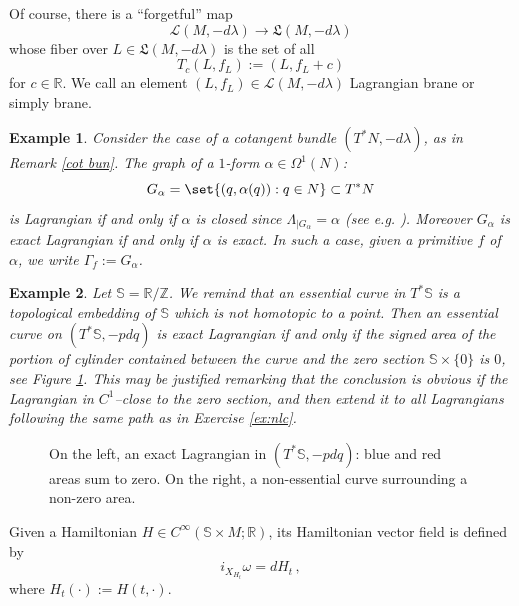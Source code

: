 \documentclass{article}
\newcommand{\1}{\mathbbm{1}}
\newtheorem{es}{Example}
\theoremstyle{remark}
\begin{document}
Of course,  there is a ``forgetful'' map
$$\mathscr{L}(M, -d\lambda) \rightarrow \mathfrak{L}(M, -d\lambda)$$
whose fiber over $L \in \mathfrak{L}(M, -d\lambda)$ is the set of all
$$T_c(L,f_L) := (L,f_L + c)$$
for $c \in \mathbb{R}$. We call an element $(L,f_L) \in \mathscr{L}(M, -d\lambda)$ Lagrangian brane or simply brane. 
\begin{es} \textnormal{Consider the case of a cotangent bundle $(T^*N,-d\lambda)$, as in Remark \ref{cot bun}. The graph of a $1$-form $\alpha \in \Omega^1(N)$:
$$G_\alpha = \set{ (q,\alpha(q)): q \in N} \subset T^*N$$
is Lagrangian if and only if $\alpha$ is closed since $\Lambda_{\mid G_{\alpha}}=\alpha$ (see e.g. \cite[Proposition 3.4.2]{mcDSal16}). Moreover $G_\alpha$ is exact Lagrangian if and only if $\alpha$ is exact. In such a case, given a primitive $f$ of $\alpha$, we write $\Gamma_f := G_\alpha$.}
\end{es}
\begin{es} \textnormal{Let $\mathbb{S}=\mathbb{R}/\mathbb{Z}$. We remind that an essential curve in $T^*\mathbb{S}$ is a topological embedding of $\mathbb{S}$ which is not homotopic to a point. Then an essential curve on $(T^*\mathbb{S}, -pdq)$ is exact Lagrangian if and only if the signed area of the portion of cylinder contained between the curve and the zero section $\mathbb{S} \times \{0\}$ is $0$, see Figure \ref{Lag Cil}. This may be justified remarking that the conclusion is obvious if the Lagrangian in $C^1$--close to the zero section, and then extend it to all Lagrangians following the same path as in Exercise \ref{ex:nlc}.} \newline
\end{es}
\begin{figure}[H]
\centering
 \resizebox{0.7\linewidth}{!}{
}
\caption{On the left, an exact Lagrangian in $(T^*\mathbb{S}, -pdq)$: blue and red areas sum to zero. On the right, a non-essential curve surrounding a non-zero area.}
\label{Lag Cil}
\end{figure}
\noindent Given a Hamiltonian $H \in C^\infty(\mathbb{S} \times M; \mathbb{R})$, its Hamiltonian vector field is defined by 
 $$i_{X_{H_t}} \omega = dH_t\, ,$$
where $H_t(\cdot) := H(t,\cdot)$. \\
\\
\end{document}
